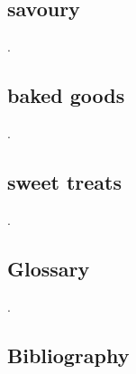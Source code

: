 \documentclass[a4paper,12pt,titlepage]{article}
\begin{document}
\begin{centering}
	\section{savoury}
\end{centering}
.

\newpage
\begin{centering}
	\section{baked goods}
\end{centering}
.

\newpage
\begin{centering}
	\section{sweet treats}
\end{centering}
.

\newpage
\begin{centering}
	\section{Glossary}
\end{centering}
.
\printglossaries
\newpage
\begin{centering}
\section{Bibliography}
\end{centering}
\begin{refsection}
\nocite{*}
\printbibliography
\end{refsection}
\end{document}
